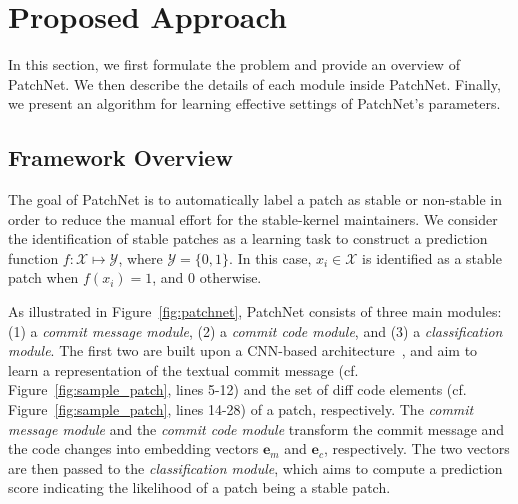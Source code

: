 \section{Proposed Approach}
\label{sec:approach}

In this section, we first formulate the problem and provide an overview of PatchNet. We then describe the details of each module inside PatchNet. Finally, we present an algorithm for learning effective settings of PatchNet's parameters.

\vspace{-0.5em}
\subsection{Framework Overview}
\label{sec:overall_framework}

The goal of PatchNet is to automatically label a
patch as stable or non-stable in order to reduce the manual effort for the stable-kernel maintainers. 
We consider the identification of stable patches as a learning task to construct a prediction function $f:
\mathcal{X} \longmapsto \mathcal{Y}$, where $\mathcal{Y} = \{0, 1\}$. In
this case, $x_i \in \mathcal{X}$ is identified as a stable patch when $f(x_i) = 1$, and 0 otherwise.

As illustrated in Figure~\ref{fig:patchnet}, PatchNet consists of three
main modules: (1) a \textit{commit message module}, (2) a \textit{commit
  code module}, and (3) a \textit{classification module}.  The first two
are built upon a CNN-based architecture~\cite{lecun1998gradient, krizhevsky2012imagenet}, and aim
to learn a representation of the textual commit message
(cf. Figure~\ref{fig:sample_patch}, lines 5-12) and the set of diff code
elements (cf. Figure~\ref{fig:sample_patch}, lines 14-28) of a patch,
respectively.  The \textit{commit message module} and the \textit{commit
  code module} transform the commit message and the code changes into
embedding vectors $\mathbf{e}_m$ and $\mathbf{e}_c$, respectively. The two
vectors are then passed to the \textit{classification module}, which aims to compute a prediction score indicating the likelihood of a patch being a stable patch.

